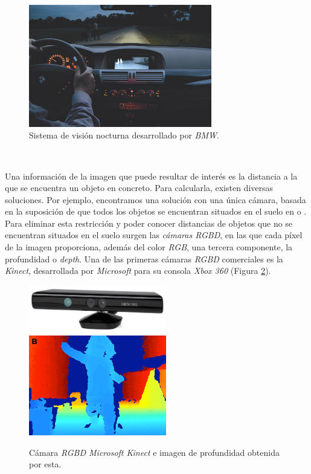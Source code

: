 \begin{figure} [h!]
	\begin{center}
		\includegraphics[width=8cm]{figs/nightvision}
	\end{center}
	\caption{Sistema de visión nocturna desarrollado por \textit{BMW}.}
	\label{fig:nightvision}
\end{figure}\

Una información de la imagen que puede resultar de interés es la distancia a la que se encuentra un objeto en concreto. Para calcularla, existen diversas soluciones. Por ejemplo, encontramos una solución con una única cámara, basada en la suposición de que todos los objetos se encuentran situados en el suelo en \cite{vega19d} o \cite{distanceopencv}. Para eliminar esta restricción y poder conocer distancias de objetos que no se encuentran situados en el suelo surgen las \textit{cámaras RGBD}, en las que cada píxel de la imagen proporciona, además del color \textit{RGB}, una tercera componente, la profundidad o \textit{depth}. Una de las primeras cámaras \textit{RGBD} comerciales es la \textit{Kinect}, desarrollada por \textit{Microsoft} para su consola \textit{Xbox 360} (Figura \ref{fig:kinect}).\\

\begin{figure} [h!]
	\begin{center}
		\includegraphics[width=6cm]{figs/kinect}\hspace{0.5cm}\includegraphics[width=6cm]{figs/depth}
	\end{center}
	\caption{Cámara \textit{RGBD Microsoft Kinect} e imagen de profundidad obtenida por esta.}
	\label{fig:kinect}
\end{figure}\

